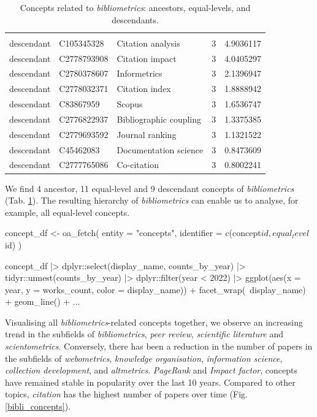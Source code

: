 \begin{table}[ht]
\begin{tabular}{lllrr}
\hline
\\
descendant  & C105345328  & Citation analysis      & 3                         & 4.9036117                 \\
descendant  & C2778793908 & Citation impact        & 3                         & 4.0405297                 \\
descendant  & C2780378607 & Informetrics           & 3                         & 2.1396947                 \\
descendant  & C2778032371 & Citation index         & 3                         & 1.8888942                 \\
descendant  & C83867959   & Scopus                 & 3                         & 1.6536747                 \\
descendant  & C2776822937 & Bibliographic coupling & 3                         & 1.3375385                 \\
descendant  & C2779693592 & Journal ranking        & 3                         & 1.1321522                 \\
descendant  & C45462083   & Documentation science  & 3                         & 0.8473609                 \\
descendant  & C2777765086 & Co-citation            & 3                         & 0.8002241                 \\
\hline
\end{tabular}
\caption{Concepts related to \emph{bibliometrics}: ancestors, equal-levels, and descendants.}
\label{tab:related_concepts}
\end{table}

We find 4 ancestor, 11 equal-level and 9 descendant concepts of \emph{bibliometrics} (Tab. \ref{tab:related_concepts}).
The resulting hierarchy of \emph{bibliometrics} can enable us to analyse, for example, all equal-level concepts. 

\begin{example}
concept_df <- oa_fetch(
  entity = "concepts",
  identifier = c(concept$id, equal_level$id)
)

concept_df |>
  dplyr::select(display_name, counts_by_year) |>
  tidyr::unnest(counts_by_year) |>
  dplyr::filter(year < 2022) |>
  ggplot(aes(x = year, y = works_count, color = display_name)) +
  facet_wrap(~display_name) +
  geom_line() +
  ...
\end{example}

Visualising all \emph{bibliometrics}-related concepts together, we observe an increasing trend in the subfields of \emph{bibliometrics}, \emph{peer review}, \emph{scientific literature} and \emph{scientometrics}.
Conversely, there has been a reduction in the number of papers in the subfields of \emph{webometrics}, \emph{knowledge organisation}, \emph{information science}, \emph{collection development}, and \emph{altmetrics}.
\emph{PageRank} and \emph{Impact factor}, concepts have remained stable in popularity over the last 10 years.
Compared to other topics, \emph{citation} has the highest number of papers over time (Fig. \ref{bibli_concepts}).

